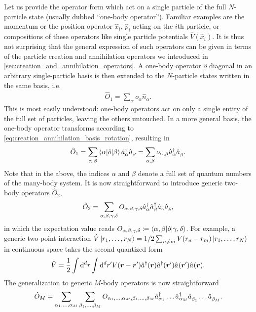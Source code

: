 Let us provide the operator form which act on a single particle of the full $N$-particle state (usually dubbed ``one-body operator'').
Familiar examples are the momentum or the position operator $\hat x_i$, $\hat p_i$ acting on the $i$th particle, or compositions of these operators like single particle potentials $\hat V(\hat x_i)$.
It is thus not surprising that the general expression of such operators can be given in terms of the particle creation and annihilation operators we introduced in \cref{sec:creation_and_annihilation_operators}.
A one-body operator $\hat o$ diagonal in an arbitrary single-particle basis is then extended to the $N$-particle states written in the same basis, i.e.
\begin{align}
    \hat O_1
    = \sum_{\alpha} o_{\alpha}\hat n_{\alpha}.
\end{align}
This is most easily understood: one-body operators act on only a single entity of the full set of particles, leaving the others untouched.
In a more general basis, the one-body operator transforms according to \cref{eq:creation_annihilation_basis_rotation}, resulting in
\begin{align}
    \hat O_1 = \sum_{\alpha, \beta}\braket{\alpha | \hat o | \beta} \hat a^\dag_\alpha \hat a^\pdag_\beta = \sum_{\alpha,\beta}o_{\alpha,\beta}\hat a^\dag_\alpha \hat a^\pdag_\beta.
    \label{eq:one_body_operator}
\end{align}
Note that in the above, the indices $\alpha$ and $\beta$ denote a full set of quantum numbers of the many-body system.
It is now straightforward to introduce generic two-body operators $\hat O_2$,
\begin{align}
    \hat O_2 = \sum_{\alpha,\beta,\gamma,\delta}O_{\alpha,\beta,\gamma,\delta}\hat a^\dag_\alpha \hat a^\dag_\beta \hat a^\pdag_\gamma \hat a^\pdag_\delta,
\end{align}
in which the expectation value reads $O_{\alpha,\beta,\gamma,\delta}\coloneqq \braket{\alpha,\beta | \hat o | \gamma,\delta}$.
For example, a generic two-point interaction $\hat V\ket{r_1,\dots,r_N}=1/2\sum_{n\neq m}V(r_n-r_m)\ket{r_1,\dots,r_N}$ in continuous space takes the second quantized form
\begin{align}
    \hat V = \frac12\int{\rd^d r}\int{\rd^d r'}V({\bm r}-{\bm r'})\hat a^\dag({\bm r})\hat a^\dag({\bm r'})\hat a^\pdag({\bm r'})\hat a^\pdag({\bm r}).
    \label{eq:two_point_interaction}
\end{align}
The generalization to generic $M$-body operators is now straightforward
\begin{align}
    \hat O_M = \sum_{\alpha_1,\dots,\alpha_M}\sum_{\beta_1,\dots,\beta_M}O_{\alpha_1,\dots,\alpha_M,\beta_1,\dots,\beta_M}\hat a^\dag_{\alpha_1}\dots \hat a^\dag_{\alpha_M}\hat a^\pdag_{\beta_1}\dots \hat a^\pdag_{\beta_M}.
\end{align}
%
%
